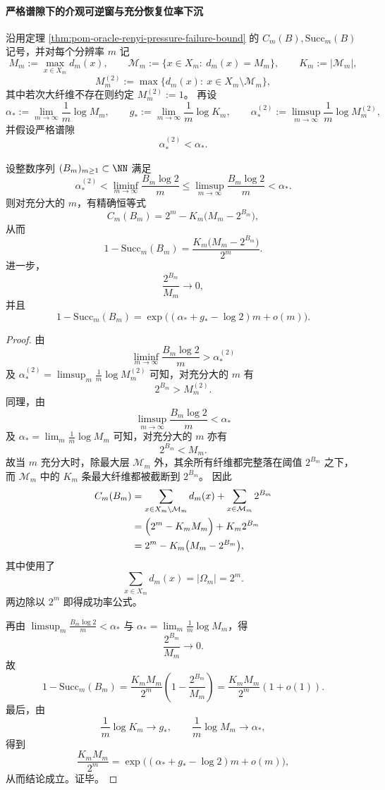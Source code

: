 \paragraph{严格谱隙下的介观可逆窗与充分恢复位率下沉}
沿用定理 \ref{thm:pom-oracle-renyi-pressure-failure-bound} 的
\(C_m(B),\mathrm{Succ}_m(B)\) 记号，并对每个分辨率 \(m\) 记
\[
M_m:=\max_{x\in X_m}d_m(x),
\qquad
\mathcal M_m:=\{x\in X_m:\ d_m(x)=M_m\},
\qquad
K_m:=|\mathcal M_m|,
\]
\[
M_m^{(2)}:=\max\{d_m(x):\ x\in X_m\setminus\mathcal M_m\},
\]
其中若次大纤维不存在则约定 \(M_m^{(2)}:=1\)。
再设
\[
\alpha_\ast:=\lim_{m\to\infty}\frac{1}{m}\log M_m,\qquad
g_\ast:=\lim_{m\to\infty}\frac{1}{m}\log K_m,
\qquad
\alpha_\ast^{(2)}:=\limsup_{m\to\infty}\frac{1}{m}\log M_m^{(2)},
\]
并假设严格谱隙
\[
\alpha_\ast^{(2)}<\alpha_\ast.
\]

\begin{theorem}[严格谱隙下存在一段严格低于最大纤维尺度的介观可逆窗]\label{thm:pom-mesoscopic-reversible-window-strict-gap}
设整数序列 \((B_m)_{m\ge 1}\subset\NN\) 满足
\[
\alpha_\ast^{(2)}
<
\liminf_{m\to\infty}\frac{B_m\log 2}{m}
\le
\limsup_{m\to\infty}\frac{B_m\log 2}{m}
<
\alpha_\ast.
\]
则对充分大的 \(m\)，有精确恒等式
\[
C_m(B_m)=2^m-K_m\bigl(M_m-2^{B_m}\bigr),
\]
从而
\[
1-\mathrm{Succ}_m(B_m)
=
\frac{K_m\bigl(M_m-2^{B_m}\bigr)}{2^m}.
\]
进一步，
\[
\frac{2^{B_m}}{M_m}\longrightarrow 0,
\]
并且
\[
1-\mathrm{Succ}_m(B_m)
=
\exp\!\bigl((\alpha_\ast+g_\ast-\log 2)m+o(m)\bigr).
\]
\end{theorem}
\begin{proof}
由
\[
\liminf_{m\to\infty}\frac{B_m\log 2}{m}>\alpha_\ast^{(2)}
\]
及 \(\alpha_\ast^{(2)}=\limsup_m \frac{1}{m}\log M_m^{(2)}\) 可知，对充分大的 \(m\) 有
\[
2^{B_m}>M_m^{(2)}.
\]
同理，由
\[
\limsup_{m\to\infty}\frac{B_m\log 2}{m}<\alpha_\ast
\]
及 \(\alpha_\ast=\lim_m \frac{1}{m}\log M_m\) 可知，对充分大的 \(m\) 亦有
\[
2^{B_m}<M_m.
\]
故当 \(m\) 充分大时，除最大层 \(\mathcal M_m\) 外，其余所有纤维都完整落在阈值 \(2^{B_m}\) 之下，而 \(\mathcal M_m\) 中的 \(K_m\) 条最大纤维都被截断到 \(2^{B_m}\)。
因此
\[
\begin{aligned}
C_m(B_m)
&=\sum_{x\in X_m\setminus\mathcal M_m} d_m(x)+\sum_{x\in\mathcal M_m}2^{B_m}\\
&=\Bigl(2^m-K_mM_m\Bigr)+K_m2^{B_m}\\
&=2^m-K_m\bigl(M_m-2^{B_m}\bigr),
\end{aligned}
\]
其中使用了
\[
\sum_{x\in X_m}d_m(x)=|\Omega_m|=2^m.
\]
两边除以 \(2^m\) 即得成功率公式。

再由 \(\limsup_m \frac{B_m\log 2}{m}<\alpha_\ast\) 与
\(\alpha_\ast=\lim_m \frac1m\log M_m\)，得
\[
\frac{2^{B_m}}{M_m}\longrightarrow 0.
\]
故
\[
1-\mathrm{Succ}_m(B_m)
=
\frac{K_mM_m}{2^m}\left(1-\frac{2^{B_m}}{M_m}\right)
=
\frac{K_mM_m}{2^m}(1+o(1)).
\]
最后，由
\[
\frac{1}{m}\log K_m\to g_\ast,
\qquad
\frac{1}{m}\log M_m\to \alpha_\ast,
\]
得到
\[
\frac{K_mM_m}{2^m}
=
\exp\!\bigl((\alpha_\ast+g_\ast-\log 2)m+o(m)\bigr),
\]
从而结论成立。证毕。
\end{proof}

